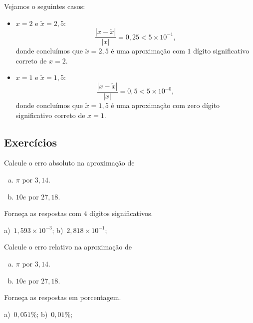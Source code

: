 \begin{ex}\label{ex:numdigsigcorr}
  Vejamos o seguintes casos:
  \begin{itemize}
  \item $x=2$ e $\tilde{x} = 2,5$:
    \begin{equation}
      \frac{|x - \tilde{x}|}{|x|} = 0,25 < 5\times 10^{-1},
    \end{equation}
donde concluímos que $\tilde{x}=2,5$ é uma aproximação com $1$ dígito significativo correto de $x=2$.
  \item $x=1$ e $\tilde{x} = 1,5$:
    \begin{equation}
      \frac{|x - \tilde{x}|}{|x|} = 0,5 < 5\times 10^{-0},
    \end{equation}
donde concluímos que $\tilde{x}=1,5$ é uma aproximação com zero dígito significativo correto de $x=1$.
  \end{itemize}
\end{ex}

\subsection*{Exercícios}

\begin{exer}\label{exer:erro_abs}
  Calcule o erro absoluto na aproximação de
  \begin{enumerate}[a)]
  \item $\pi$ por $3,14$.
  \item $10e$ por $27,18$.
  \end{enumerate}
  Forneça as respostas com $4$ dígitos significativos.
\end{exer}
\begin{resp}

  a)~$1,593\times 10^{-3}$; b)~$2,818\times 10^{-1}$;
\end{resp}

\begin{exer}\label{exer:erro_rel}
  Calcule o erro relativo na aproximação de
  \begin{enumerate}[a)]
  \item $\pi$ por $3,14$.
  \item $10e$ por $27,18$.
  \end{enumerate}
  Forneça as respostas em porcentagem.
\end{exer}
\begin{resp}

  a)~$0,051\%$; b)~$0,01\%$;
\end{resp}

